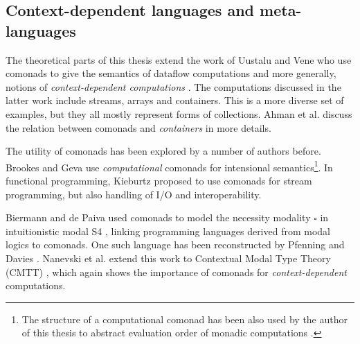
\subsection{Context-dependent languages and meta-languages}
\label{sec:path-sem-contextdep}

The theoretical parts of this thesis extend the work of Uustalu and Vene who use comonads
to give the semantics of dataflow computations \cite{comonads-dataflow} and more generally,
notions of \emph{context-dependent computations} \cite{comonads-notions}. The computations discussed
in the latter work include streams, arrays and containers. This is a more diverse set of examples,
but they all mostly represent forms of collections. Ahman et al. \cite{comonads-containers} discuss
the relation between comonads and \emph{containers} \cite{types-containers} in more details.

The utility of comonads has been explored by a number of authors before. Brookes and Geva
\cite{comonads-computational} use \emph{computational} comonads for intensional semantics\footnote{The
structure of a computational comonad has been also used by the author of this thesis to abstract
evaluation order of monadic computations \cite{comonads-malias}.}. In functional programming,
Kieburtz \cite{comonads-and-codata} proposed to use comonads for stream programming, but also
handling of I/O and interoperability.

Biermann and de Paiva used comonads to model the necessity modality $\square$ in intuitionistic
modal S4 \cite{logic-intuitionistic-modal}, linking programming languages derived from modal
logics to comonads. One such language has been reconstructed by Pfenning and Davies
\cite{logic-modal-reconstruction}. Nanevski et al. extend this work to Contextual Modal Type
Theory (CMTT) \cite{logic-cmtt}, which again shows the importance of comonads for
\emph{context-dependent} computations.

